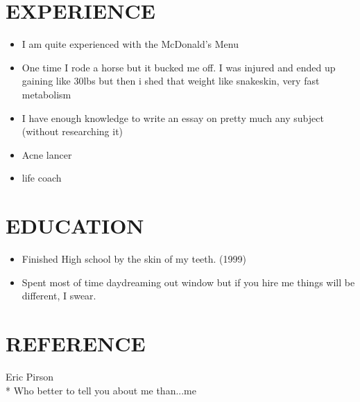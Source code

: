 \documentclass{article}
\begin{document}
\section{EXPERIENCE}
\begin{itemize}
    \item I am quite experienced with the McDonald's Menu
    \item One time I rode a horse but it bucked me off. I was injured and ended up gaining like 30lbs but then i shed that weight like snakeskin, very fast metabolism
    \item I have enough knowledge  to write an essay on pretty much any subject (without researching it)
    \item Acne lancer
    \item life coach
\end{itemize}

\section{EDUCATION}
\begin{itemize}
    \item Finished High school by the skin of my teeth. (1999)
    \item Spent most of time daydreaming out window but if you hire me things will be different, I swear.
\end{itemize}

\section{REFERENCE}
Eric Pirson\\*
Who better to tell you about me than...me  
\end{document}
